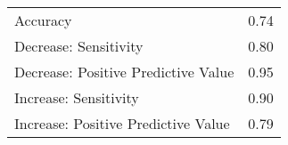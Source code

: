 \begin{table}[ht]
\centering
\begin{tabular}{lr}
  \hline
 &  \\ 
  \hline
Accuracy & 0.74 \\ 
  Decrease: Sensitivity & 0.80 \\ 
  Decrease: Positive Predictive Value & 0.95 \\ 
  Increase: Sensitivity & 0.90 \\ 
  Increase: Positive Predictive Value & 0.79 \\ 
   \hline
\end{tabular}
\end{table}
